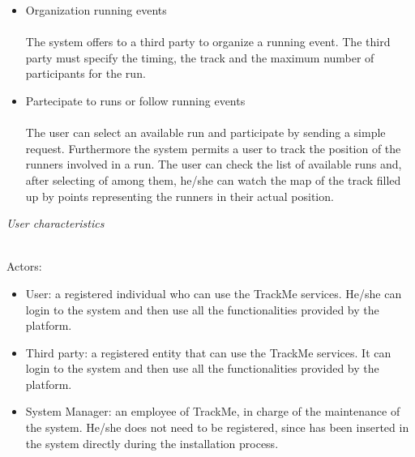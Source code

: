 \documentclass{article}
\begin{document}
\begin{legal}
\begin{legal}
{\begin{itemize}
		The system keeps under control the health status of a user by monitoring the values of the health parameters acquired by external devices (smart watches or similar devices). If at least one of the parameters goes under a fixed threshold, the system generates an SOS within 5 seconds starting from the moment of the evaluation of the dangerous parameter. The SOS communicates to the ambulance the position of the user.\\
		\item Organization running events\\\\
		The system offers to a third party to organize a running event. The third party must specify the timing, the track and the maximum number of participants for the run.\\
		\item Partecipate to runs or follow running events\\\\
		The user can select an available run and participate by sending a simple request. Furthermore the system permits a user to track the position of the runners involved in a run. The user can check the list of available runs and, after selecting of among them, he/she can watch the map of the track filled up by points representing the runners in their actual position. \\
		\end{itemize}
		}
		\item \textit{User characteristics} \\\\
			{\normalfont
			Actors:\\
			\begin{itemize}
			 \item User: a registered individual who can use the TrackMe services. He/she can login to the system and then use all the functionalities provided by the platform.\\
			\item Third party: a registered entity that can use the TrackMe services. It can login to the system and then use all the functionalities provided by the platform.\\
 			\item System Manager:  an employee of TrackMe, in charge of the maintenance of the system. He/she does not need to be registered, since has been inserted in the system directly during the installation process.\\
			\end{itemize}
}
\end{legal}
\end{legal}
\end{document}
